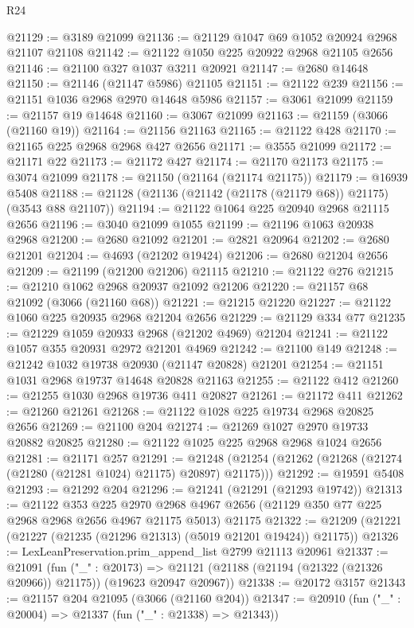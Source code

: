 \begin{lexlean}{R24}
\begin{coremodule}
@21129 := @3189 @21099
@21136 := @21129 @1047 @69 @1052 @20924 @2968 @21107 @21108
@21142 := @21122 @1050 @225 @20922 @2968 @21105 @2656
@21146 := @21100 @327 @1037 @3211 @20921
@21147 := @2680 @14648
@21150 := @21146 (@21147 @5986) @21105
@21151 := @21122 @239
@21156 := @21151 @1036 @2968 @2970 @14648 @5986
@21157 := @3061 @21099
@21159 := @21157 @19 @14648
@21160 := @3067 @21099
@21163 := @21159 (@3066 (@21160 @19))
@21164 := @21156 @21163
@21165 := @21122 @428
@21170 := @21165 @225 @2968 @2968 @427 @2656
@21171 := @3555 @21099
@21172 := @21171 @22
@21173 := @21172 @427
@21174 := @21170 @21173
@21175 := @3074 @21099
@21178 := @21150 (@21164 (@21174 @21175))
@21179 := @16939 @5408
@21188 := @21128 (@21136 (@21142 (@21178 (@21179 @68)) @21175) (@3543 @88 @21107))
@21194 := @21122 @1064 @225 @20940 @2968 @21115 @2656
@21196 := @3040 @21099 @1055
@21199 := @21196 @1063 @20938 @2968
@21200 := @2680 @21092
@21201 := @2821 @20964
@21202 := @2680 @21201
@21204 := @4693 (@21202 @19424)
@21206 := @2680 @21204 @2656
@21209 := @21199 (@21200 @21206) @21115
@21210 := @21122 @276
@21215 := @21210 @1062 @2968 @20937 @21092 @21206
@21220 := @21157 @68 @21092 (@3066 (@21160 @68))
@21221 := @21215 @21220
@21227 := @21122 @1060 @225 @20935 @2968 @21204 @2656
@21229 := @21129 @334 @77
@21235 := @21229 @1059 @20933 @2968 (@21202 @4969) @21204
@21241 := @21122 @1057 @355 @20931 @2972 @21201 @4969
@21242 := @21100 @149
@21248 := @21242 @1032 @19738 @20930 (@21147 @20828) @21201
@21254 := @21151 @1031 @2968 @19737 @14648 @20828 @21163
@21255 := @21122 @412
@21260 := @21255 @1030 @2968 @19736 @411 @20827
@21261 := @21172 @411
@21262 := @21260 @21261
@21268 := @21122 @1028 @225 @19734 @2968 @20825 @2656
@21269 := @21100 @204
@21274 := @21269 @1027 @2970 @19733 @20882 @20825
@21280 := @21122 @1025 @225 @2968 @2968 @1024 @2656
@21281 := @21171 @257
@21291 := @21248 (@21254 (@21262 (@21268 (@21274 (@21280 (@21281 @1024) @21175) @20897) @21175)))
@21292 := @19591 @5408
@21293 := @21292 @204
@21296 := @21241 (@21291 (@21293 @19742))
@21313 := @21122
    @353
    @225
    @2970
    @2968
    @4967
    @2656
    (@21129 @350 @77 @225 @2968 @2968 @2656 @4967 @21175 @5013)
    @21175
@21322 := @21209 (@21221 (@21227 (@21235 (@21296 @21313) (@5019 @21201 @19424)) @21175))
@21326 := LexLeanPreservation.prim_append_list @2799 @21113 @20961
@21337 := @21091
    (fun ("_" : @20173) =>
    @21121 (@21188 (@21194 (@21322 (@21326 @20966)) @21175)) (@19623 @20947 @20967))
@21338 := @20172 @3157
@21343 := @21157 @204 @21095 (@3066 (@21160 @204))
@21347 := @20910 (fun ("_" : @20004) => @21337 (fun ("_" : @21338) => @21343))

\end{coremodule}
\end{lexlean}
